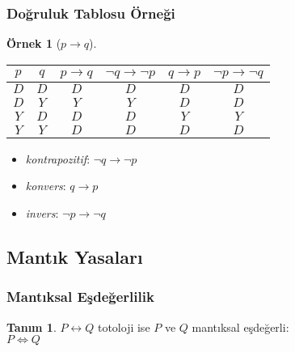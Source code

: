 \documentclass[dvipsnames]{beamer}
\theoremstyle{definition}
\newtheorem{tanim}[theorem]{Tanım}
\theoremstyle{example}
\newtheorem{ornek}[theorem]{Örnek}
\theoremstyle{plain}
\begin{document}
\begin{frame}
  \frametitle{Doğruluk Tablosu Örneği}

  \begin{ornek}[$p \rightarrow q$]
    \begin{center}
      \begin{tabular}{|c|c||c|c|c|c|}\hline
        $p$ & $q$ & $p \rightarrow q$ & $\neg q \rightarrow \neg p$ &
                    $q \rightarrow p$ & $\neg p \rightarrow \neg q$\\\hline\hline
        $D$ & $D$ & $D$ & $D$ & $D$ & $D$\\\hline
        $D$ & $Y$ & $Y$ & $Y$ & $D$ & $D$\\\hline
        $Y$ & $D$ & $D$ & $D$ & $Y$ & $Y$\\\hline
        $Y$ & $Y$ & $D$ & $D$ & $D$ & $D$\\\hline
      \end{tabular}
    \end{center}

    \pause
    \begin{itemize}
      \item \emph{kontrapozitif}: $\neg q \rightarrow \neg p$

      \pause
      \item \emph{konvers}: $q \rightarrow p$

      \pause
      \item \emph{invers}: $\neg p \rightarrow \neg q$
    \end{itemize}
  \end{ornek}
\end{frame}

\subsection{Mantık Yasaları}

\begin{frame}
  \frametitle{Mantıksal Eşdeğerlilik}

  \begin{tanim}
    $P \leftrightarrow Q$ totoloji ise $P$ ve $Q$ \alert{mantıksal eşdeğerli}:\\
    $P \Leftrightarrow Q$
  \end{tanim}
\end{frame}
\end{document}
